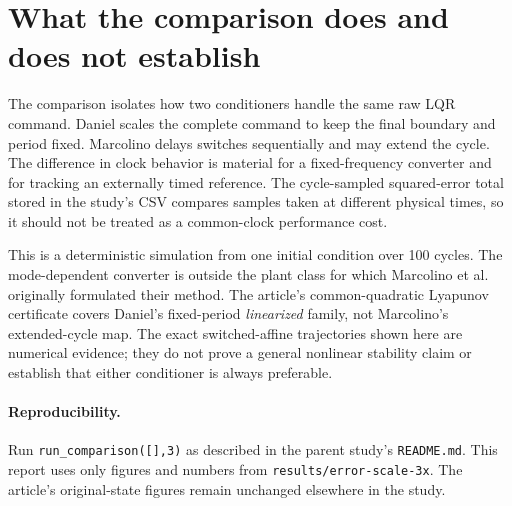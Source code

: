 \documentclass[11pt,a4paper]{article}
\begin{document}
\section{What the comparison does and does not establish}

The comparison isolates how two conditioners handle the same raw LQR command. Daniel scales the complete command to keep the final boundary and period fixed. Marcolino delays switches sequentially and may extend the cycle. The difference in clock behavior is material for a fixed-frequency converter and for tracking an externally timed reference. The cycle-sampled squared-error total stored in the study's CSV compares samples taken at different physical times, so it should not be treated as a common-clock performance cost.

This is a deterministic simulation from one initial condition over 100 cycles. The mode-dependent converter is outside the plant class for which Marcolino et al. originally formulated their method. The article's common-quadratic Lyapunov certificate covers Daniel's fixed-period \emph{linearized} family, not Marcolino's extended-cycle map. The exact switched-affine trajectories shown here are numerical evidence; they do not prove a general nonlinear stability claim or establish that either conditioner is always preferable.

\paragraph{Reproducibility.} Run \texttt{run\_comparison([],3)} as described in the parent study's \texttt{README.md}. This report uses only figures and numbers from \texttt{results/error-scale-3x}. The article's original-state figures remain unchanged elsewhere in the study.
\end{document}
